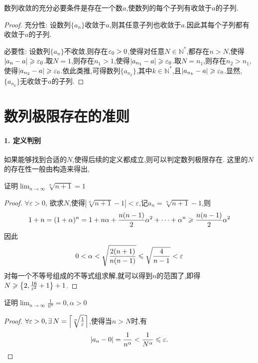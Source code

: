 \begin{proposition}
    数列收敛的充分必要条件是存在一个数$a$,使数列的每个子列有收敛于$a$的子列.
\end{proposition}

\begin{proof}
    充分性: 设数列$\{a_n\}$收敛于$a$,则其任意子列也收敛于$a$.因此其每个子列都有收敛于$a$的子列.

    必要性: 设数列$\{a_n\}$不收敛,则存在$\varepsilon_0 > 0$,使得对任意$N \in \mathbb{N}^*$,都存在$n > N$,使得$|a_n - a| \geqslant \varepsilon_0$.取$N = 1$,则存在$n_1 > 1$,使得$|a_{n_1} - a| \geqslant \varepsilon_0$.取$N = n_1$,则存在$n_2 > n_1$,使得$|a_{n_2} - a| \geqslant \varepsilon_0$.依此类推,可得数列$\{a_{n_k}\}$,其中$k \in \mathbb{N}^*$,且$|a_{n_k} - a| \geqslant \varepsilon_0$.显然, $\{a_{n_k}\}$无收敛于$a$的子列.
\end{proof}

\section{数列极限存在的准则}

\paragraph*{1. 定义判别}

如果能够找到合适的$N$,使得后续的定义都成立,则可以判定数列极限存在. 这里的$N$的存在性一般由构造来得出,

\begin{example}
    证明$\lim_{n \to \infty} \sqrt[n]{n+1}=1$
    \begin{proof}
        $\forall \varepsilon>0$, 欲求$N$,使得$|\sqrt[n]{n+1}-1|<\varepsilon$,记$a_n=\sqrt[n]{n+1}-1$,则
        $$
            1+n = (1+\alpha)^n = 1 + n\alpha + \frac{n(n-1)}{2}\alpha^2 + \cdots + \alpha^n \geqslant \frac{n(n-1)}{2}\alpha^2
        $$
        因此
        $$
            0<\alpha<\sqrt{\frac{2(n+1)}{n(n-1)}} \leqslant \sqrt{\frac{4}{n-1}} < \varepsilon
        $$
        对每一个不等号组成的不等式组求解,就可以得到$n$的范围了,即得$N \geqslant \left\{2,\frac{16}{\varepsilon^2}+1\right\}+1$.
    \end{proof}
\end{example}

\begin{example}
    证明$\lim_{n \to \infty} \frac{1}{n^\alpha} = 0, \alpha > 0$
\end{example}

\begin{proof}
    $\forall \varepsilon > 0, \exists N = \llceil \sqrt[\alpha]{\frac{1}{\varepsilon}} \rrceil$,使得当$n > N$时,有
    $$|a_n - 0| = \frac{1}{n^\alpha} < \frac{1}{N^\alpha} \leqslant \varepsilon.$$
\end{proof}

